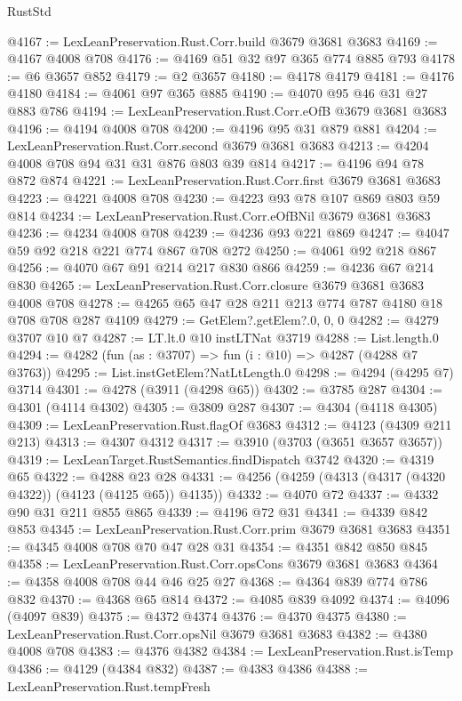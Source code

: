 \begin{lexlean}{RustStd}
\begin{coremodule}
{\begin{coremodule}
{{{{{{{{{{{{{{@4167 := LexLeanPreservation.Rust.Corr.build @3679 @3681 @3683
@4169 := @4167 @4008 @708
@4176 := @4169 @51 @32 @97 @365 @774 @885 @793
@4178 := @6 @3657 @852
@4179 := @2 @3657
@4180 := @4178 @4179
@4181 := @4176 @4180
@4184 := @4061 @97 @365 @885
@4190 := @4070 @95 @46 @31 @27 @883 @786
@4194 := LexLeanPreservation.Rust.Corr.eOfB @3679 @3681 @3683
@4196 := @4194 @4008 @708
@4200 := @4196 @95 @31 @879 @881
@4204 := LexLeanPreservation.Rust.Corr.second @3679 @3681 @3683
@4213 := @4204 @4008 @708 @94 @31 @31 @876 @803 @39 @814
@4217 := @4196 @94 @78 @872 @874
@4221 := LexLeanPreservation.Rust.Corr.first @3679 @3681 @3683
@4223 := @4221 @4008 @708
@4230 := @4223 @93 @78 @107 @869 @803 @59 @814
@4234 := LexLeanPreservation.Rust.Corr.eOfBNil @3679 @3681 @3683
@4236 := @4234 @4008 @708
@4239 := @4236 @93 @221 @869
@4247 := @4047 @59 @92 @218 @221 @774 @867 @708 @272
@4250 := @4061 @92 @218 @867
@4256 := @4070 @67 @91 @214 @217 @830 @866
@4259 := @4236 @67 @214 @830
@4265 := LexLeanPreservation.Rust.Corr.closure @3679 @3681 @3683 @4008 @708
@4278 := @4265 @65 @47 @28 @211 @213 @774 @787 @4180 @18 @708 @708 @287 @4109
@4279 := GetElem?.getElem?.{0, 0, 0}
@4282 := @4279 @3707 @10 @7
@4287 := LT.lt.{0} @10 instLTNat @3719
@4288 := List.length.{0}
@4294 := @4282 (fun (as : @3707) => fun (i : @10) => @4287 (@4288 @7 @3763))
@4295 := List.instGetElem?NatLtLength.{0}
@4298 := @4294 (@4295 @7) @3714
@4301 := @4278 (@3911 (@4298 @65))
@4302 := @3785 @287
@4304 := @4301 (@4114 @4302)
@4305 := @3809 @287
@4307 := @4304 (@4118 @4305)
@4309 := LexLeanPreservation.Rust.flagOf @3683
@4312 := @4123 (@4309 @211 @213)
@4313 := @4307 @4312
@4317 := @3910 (@3703 (@3651 @3657 @3657))
@4319 := LexLeanTarget.RustSemantics.findDispatch @3742
@4320 := @4319 @65
@4322 := @4288 @23 @28
@4331 := @4256 (@4259 (@4313 (@4317 (@4320 @4322)) (@4123 (@4125 @65)) @4135))
@4332 := @4070 @72
@4337 := @4332 @90 @31 @211 @855 @865
@4339 := @4196 @72 @31
@4341 := @4339 @842 @853
@4345 := LexLeanPreservation.Rust.Corr.prim @3679 @3681 @3683
@4351 := @4345 @4008 @708 @70 @47 @28 @31
@4354 := @4351 @842 @850 @845
@4358 := LexLeanPreservation.Rust.Corr.opsCons @3679 @3681 @3683
@4364 := @4358 @4008 @708 @44 @46 @25 @27
@4368 := @4364 @839 @774 @786 @832
@4370 := @4368 @65 @814
@4372 := @4085 @839 @4092
@4374 := @4096 (@4097 @839)
@4375 := @4372 @4374
@4376 := @4370 @4375
@4380 := LexLeanPreservation.Rust.Corr.opsNil @3679 @3681 @3683
@4382 := @4380 @4008 @708
@4383 := @4376 @4382
@4384 := LexLeanPreservation.Rust.isTemp
@4386 := @4129 (@4384 @832)
@4387 := @4383 @4386
@4388 := LexLeanPreservation.Rust.tempFresh
}}}}}}}}}}}}}}
\end{coremodule}}
\end{coremodule}
\end{lexlean}
